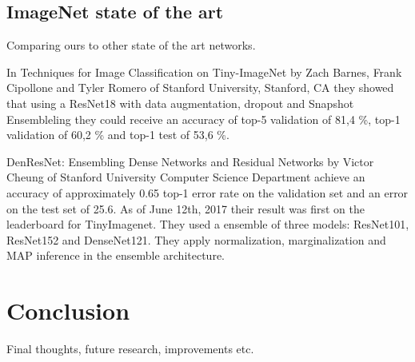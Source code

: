 \documentclass{kthreport}
\begin{document}
\subsection{ImageNet state of the art}

Comparing ours to other state of the art networks.

In Techniques for Image Classification on Tiny-ImageNet by Zach Barnes, Frank Cipollone and Tyler Romero of Stanford University, Stanford, CA they showed that using a ResNet18 with data augmentation, dropout and Snapshot Ensembleling they could receive an accuracy of top-5 validation of 81,4 \%, top-1 validation of 60,2 \% and top-1 test of 53,6 \%.


DenResNet: Ensembling Dense Networks and Residual Networks by Victor Cheung of Stanford University Computer Science Department achieve an accuracy of approximately 0.65 top-1 error rate on the validation set and an error on the test set of 25.6. As of June 12th, 2017 their result was first on the leaderboard for TinyImagenet. They used a  ensemble of three models: ResNet101, ResNet152 and DenseNet121. They apply normalization, marginalization and MAP inference in the ensemble architecture.

\section{Conclusion}
Final thoughts, future research, improvements etc.



{}

\end{document}
